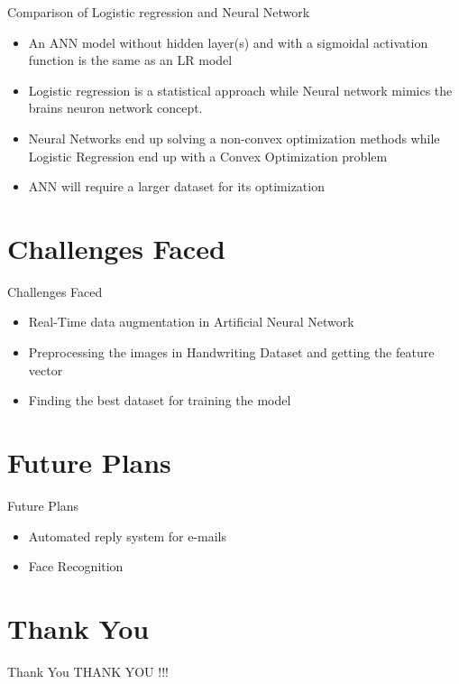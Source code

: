 \documentclass[10pt, a4paper]{beamer}
\begin{document}
\begin{frame}{Comparison of Logistic regression and Neural Network}
	\begin{itemize}
    	\item An ANN model without hidden layer(s) and with a sigmoidal activation function is the same as an LR model
		\item Logistic regression is a statistical approach while Neural network mimics the brains neuron network concept.
        \item Neural Networks end up solving a non-convex optimization methods while Logistic Regression end up with a Convex Optimization problem
        \item ANN will require a larger dataset for its optimization 
	\end{itemize}
\end{frame}

\section{Challenges Faced}
\begin{frame}{Challenges Faced}
	\begin{itemize}
    	\item Real-Time data augmentation in Artificial Neural Network
		\item Preprocessing the images in Handwriting Dataset and getting the feature vector 
        \item Finding the best dataset for training the model
  
	\end{itemize}
\end{frame}


\section{Future Plans}
\begin{frame}{Future Plans}
	\begin{itemize}
		\item Automated reply system for e-mails
        \item Face Recognition
	\end{itemize}
\end{frame}


\section{Thank You}
\begin{frame}{Thank You}
	\centering THANK YOU !!!
\end{frame}
\end{document}
